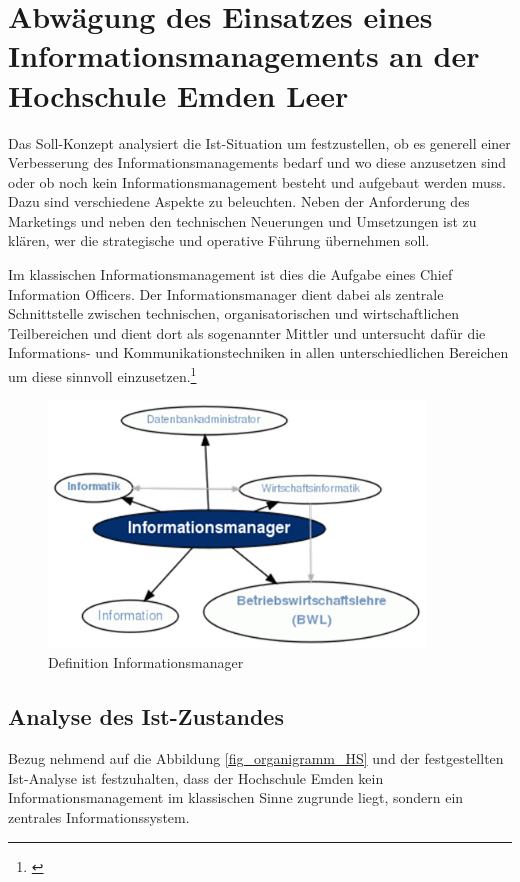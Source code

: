 \section{Abwägung des Einsatzes eines Informationsmanagements an der Hochschule Emden Leer}
Das Soll-Konzept analysiert die Ist-Situation um festzustellen, ob es generell einer Verbesserung des Informationsmanagements bedarf und wo diese anzusetzen sind oder ob noch kein Informationsmanagement besteht und aufgebaut werden muss. Dazu sind verschiedene Aspekte zu beleuchten. Neben der Anforderung des Marketings und neben den  technischen Neuerungen und Umsetzungen ist zu klären, wer die strategische und operative Führung übernehmen soll. 

Im klassischen Informationsmanagement ist dies die Aufgabe eines Chief Information Officers. Der Informationsmanager dient dabei als zentrale Schnittstelle zwischen technischen, organisatorischen und wirtschaftlichen Teilbereichen und dient dort als sogenannter Mittler und untersucht dafür die Informations- und Kommunikationstechniken in allen unterschiedlichen Bereichen um diese sinnvoll einzusetzen.\footnote{\cite[86]{krcmar_einfuhrung_2015}}

\begin{figure}[h!]
	\centering
	\includegraphics[width=10cm]{kapitel/gruppe3/bilder/definition_informationsmanager}
	\caption{Definition Informationsmanager}
	\label{fig_definition_informationsmanager}
\end{figure}

\subsection{Analyse des Ist-Zustandes}
Bezug nehmend auf die Abbildung \ref{fig_organigramm_HS} und der festgestellten Ist-Analyse ist festzuhalten, dass der Hochschule Emden kein Informationsmanagement im klassischen Sinne zugrunde liegt, sondern ein zentrales Informationssystem.


